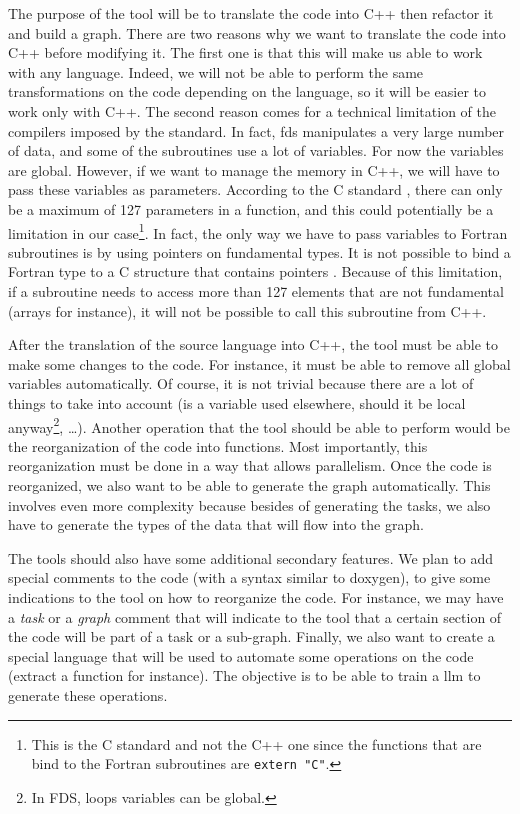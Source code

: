 The purpose of the tool will be to translate the code into C++ then refactor it
and build a graph. There are two reasons why we want to translate the code into
C++ before modifying it. The first one is that this will make us able to work
with any language. Indeed, we will not be able to perform the same
transformations on the code depending on the language, so it will be easier to
work only with C++. The second reason comes for a technical limitation of the
compilers imposed by the standard. In fact, \gls{fds} manipulates a very large
number of data, and some of the subroutines use a lot of variables. For now the
variables are global. However, if we want to manage the memory in C++, we will
have to pass these variables as parameters. According to the C standard
\cite{cstd}, there can only be a maximum of 127 parameters in a function, and
this could potentially be a limitation in our case\footnote{This is the C
standard and not the C++ one since the functions that are bind to the Fortran
subroutines are \texttt{extern "C"}.}. In fact, the only way we have to pass
variables to Fortran subroutines is by using pointers on fundamental types. It
is not possible to bind a Fortran type to a C structure that contains pointers
\cite{fortranbindstruct}. Because of this limitation, if a subroutine needs to
access more than 127 elements that are not fundamental (arrays for instance), it
will not be possible to call this subroutine from C++.

After the translation of the source language into C++, the tool must be able to
make some changes to the code. For instance, it must be able to remove all
global variables automatically. Of course, it is not trivial because there are a
lot of things to take into account (is a variable used elsewhere, should it be
local anyway\footnote{In FDS, loops variables can be global.}, \dots). Another
operation that the tool should be able to perform would be the reorganization of
the code into functions. Most importantly, this reorganization must be done in a
way that allows parallelism. Once the code is reorganized, we also want to be
able to generate the graph automatically. This involves even more complexity
because besides of generating the tasks, we also have to generate the types of
the data that will flow into the graph.

The tools should also have some additional secondary features. We plan to add
special comments to the code (with a syntax similar to doxygen), to give some
indications to the tool on how to reorganize the code. For instance, we may have
a \textit{task} or a \textit{graph} comment that will indicate to the tool that
a certain section of the code will be part of a task or a sub-graph. Finally,
we also want to create a special language that will be used to automate some
operations on the code (extract a function for instance). The objective is to be
able to train a \gls{llm} to generate these operations.

